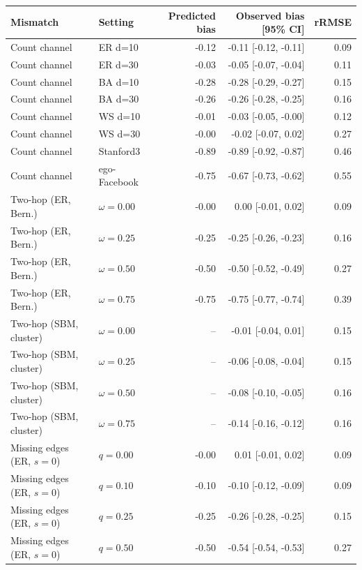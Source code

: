 \begin{tabular}{llrrr}
\toprule
Mismatch & Setting & Predicted bias & Observed bias [95\% CI] & rRMSE \\
\midrule
Count channel & ER d=10 & -0.12 & -0.11 [-0.12, -0.11] & 0.09 \\
Count channel & ER d=30 & -0.03 & -0.05 [-0.07, -0.04] & 0.11 \\
Count channel & BA d=10 & -0.28 & -0.28 [-0.29, -0.27] & 0.15 \\
Count channel & BA d=30 & -0.26 & -0.26 [-0.28, -0.25] & 0.16 \\
Count channel & WS d=10 & -0.01 & -0.03 [-0.05, -0.00] & 0.12 \\
Count channel & WS d=30 & -0.00 & -0.02 [-0.07, 0.02] & 0.27 \\
Count channel & Stanford3 & -0.89 & -0.89 [-0.92, -0.87] & 0.46 \\
Count channel & ego-Facebook & -0.75 & -0.67 [-0.73, -0.62] & 0.55 \\
\midrule
Two-hop (ER, Bern.) & $\omega=0.00$ & -0.00 & 0.00 [-0.01, 0.02] & 0.09 \\
Two-hop (ER, Bern.) & $\omega=0.25$ & -0.25 & -0.25 [-0.26, -0.23] & 0.16 \\
Two-hop (ER, Bern.) & $\omega=0.50$ & -0.50 & -0.50 [-0.52, -0.49] & 0.27 \\
Two-hop (ER, Bern.) & $\omega=0.75$ & -0.75 & -0.75 [-0.77, -0.74] & 0.39 \\
Two-hop (SBM, cluster) & $\omega=0.00$ & -- & -0.01 [-0.04, 0.01] & 0.15 \\
Two-hop (SBM, cluster) & $\omega=0.25$ & -- & -0.06 [-0.08, -0.04] & 0.15 \\
Two-hop (SBM, cluster) & $\omega=0.50$ & -- & -0.08 [-0.10, -0.05] & 0.16 \\
Two-hop (SBM, cluster) & $\omega=0.75$ & -- & -0.14 [-0.16, -0.12] & 0.16 \\
\midrule
Missing edges (ER, $s{=}0$) & $q=0.00$ & -0.00 & 0.01 [-0.01, 0.02] & 0.09 \\
Missing edges (ER, $s{=}0$) & $q=0.10$ & -0.10 & -0.10 [-0.12, -0.09] & 0.09 \\
Missing edges (ER, $s{=}0$) & $q=0.25$ & -0.25 & -0.26 [-0.28, -0.25] & 0.15 \\
Missing edges (ER, $s{=}0$) & $q=0.50$ & -0.50 & -0.54 [-0.54, -0.53] & 0.27 \\
\bottomrule
\end{tabular}
